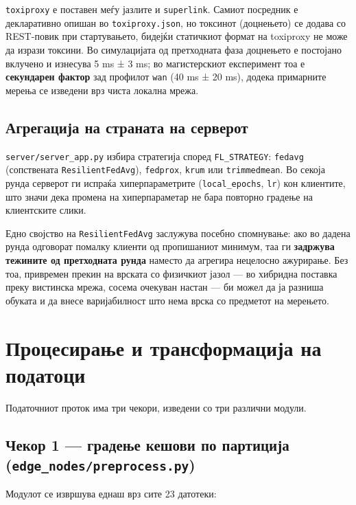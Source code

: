 \texttt{toxiproxy} е поставен меѓу јазлите и \texttt{superlink}. Самиот посредник е декларативно опишан во
\texttt{toxiproxy.json}, но токсинот (доцнењето) се додава со REST-повик при стартувањето, бидејќи
статичкиот формат на toxiproxy не може да изрази токсини. Во симулацијата од претходната
фаза доцнењето е постојано вклучено и изнесува 5 ms ± 3 ms; во магистерскиот експеримент тоа
е \textbf{секундарен фактор} зад профилот \texttt{wan} (40 ms ± 20 ms), додека примарните мерења се
изведени врз чиста локална мрежа.

\subsection{Агрегација на страната на серверот}

\texttt{server/server\_app.py} избира стратегија според \texttt{FL\_STRATEGY}: \texttt{fedavg} (сопствената
\texttt{ResilientFedAvg}), \texttt{fedprox}, \texttt{krum} или \texttt{trimmedmean}. Во секоја рунда серверот ги
испраќа хиперпараметрите (\texttt{local\_epochs}, \texttt{lr}) кон клиентите, што значи дека промена на
хиперпараметар не бара повторно градење на клиентските слики.

Едно својство на \texttt{ResilientFedAvg} заслужува посебно спомнување: ако во дадена рунда
одговорат помалку клиенти од пропишаниот минимум, таа ги \textbf{задржува тежините од претходната
рунда} наместо да агрегира нецелосно ажурирање. Без тоа, привремен прекин на врската со
физичкиот јазол --- во хибридна поставка преку вистинска мрежа, сосема очекуван настан --- би
можел да ја разниша обуката и да внесе варијабилност што нема врска со предметот на
мерењето.

\section{Процесирање и трансформација на податоци}

Податочниот проток има три чекори, изведени со три различни модули.

\subsection{Чекор 1 --- градење кешови по партиција (\texttt{edge\_nodes/preprocess.py})}

Модулот се извршува еднаш врз сите 23 датотеки:

